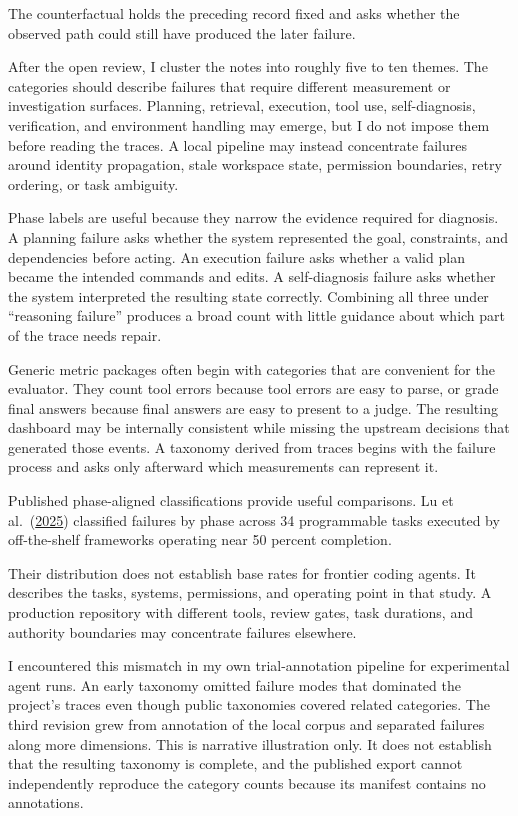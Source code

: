 The counterfactual holds the preceding record fixed and asks whether the observed path could still have produced the later failure.

After the open review, I cluster the notes into roughly five to ten themes. The categories should describe failures that require different measurement or investigation surfaces. Planning, retrieval, execution, tool use, self-diagnosis, verification, and environment handling may emerge, but I do not impose them before reading the traces. A local pipeline may instead concentrate failures around identity propagation, stale workspace state, permission boundaries, retry ordering, or task ambiguity.

Phase labels are useful because they narrow the evidence required for diagnosis. A planning failure asks whether the system represented the goal, constraints, and dependencies before acting. An execution failure asks whether a valid plan became the intended commands and edits. A self-diagnosis failure asks whether the system interpreted the resulting state correctly. Combining all three under ``reasoning failure'' produces a broad count with little guidance about which part of the trace needs repair.

Generic metric packages often begin with categories that are convenient for the evaluator. They count tool errors because tool errors are easy to parse, or grade final answers because final answers are easy to present to a judge. The resulting dashboard may be internally consistent while missing the upstream decisions that generated those events. A taxonomy derived from traces begins with the failure process and asks only afterward which measurements can represent it.

Published phase-aligned classifications provide useful comparisons. Lu et al.~(\href{https://arxiv.org/abs/2508.13143}{2025}) classified failures by phase across 34 programmable tasks executed by off-the-shelf frameworks operating near 50 percent completion.

Their distribution does not establish base rates for frontier coding agents. It describes the tasks, systems, permissions, and operating point in that study. A production repository with different tools, review gates, task durations, and authority boundaries may concentrate failures elsewhere.

I encountered this mismatch in my own trial-annotation pipeline for experimental agent runs. An early taxonomy omitted failure modes that dominated the project's traces even though public taxonomies covered related categories. The third revision grew from annotation of the local corpus and separated failures along more dimensions. This is narrative illustration only. It does not establish that the resulting taxonomy is complete, and the published export cannot independently reproduce the category counts because its manifest contains no annotations.

